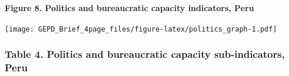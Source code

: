 \documentclass[twocolumn]{article}
\let\oldparagraph\paragraph
\renewcommand{\paragraph}[1]{\oldparagraph{#1}\mbox{}}
\begin{document}

\hypertarget{figure-8.-politics-and-bureaucratic-capacity-indicators-peru}{%
\paragraph{Figure 8. Politics and bureaucratic capacity indicators,
Peru}\label{figure-8.-politics-and-bureaucratic-capacity-indicators-peru}}

\texttt{[image: GEPD\_Brief\_4page\_files/figure-latex/politics\_graph-1.pdf]}

\hypertarget{table-4.-politics-and-bureaucratic-capacity-sub-indicators-peru}{%
\subsubsection{Table 4. Politics and bureaucratic capacity
sub-indicators,
Peru}\label{table-4.-politics-and-bureaucratic-capacity-sub-indicators-peru}}
\end{document}
